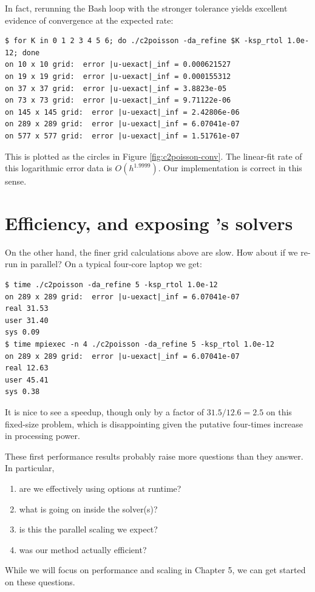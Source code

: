 In fact, rerunning the Bash loop with the stronger tolerance yields excellent evidence of convergence at the expected rate:
\begin{Verbatim}[fontsize=\small]
$ for K in 0 1 2 3 4 5 6; do ./c2poisson -da_refine $K -ksp_rtol 1.0e-12; done
on 10 x 10 grid:  error |u-uexact|_inf = 0.000621527
on 19 x 19 grid:  error |u-uexact|_inf = 0.000155312
on 37 x 37 grid:  error |u-uexact|_inf = 3.8823e-05
on 73 x 73 grid:  error |u-uexact|_inf = 9.71122e-06
on 145 x 145 grid:  error |u-uexact|_inf = 2.42806e-06
on 289 x 289 grid:  error |u-uexact|_inf = 6.07041e-07
on 577 x 577 grid:  error |u-uexact|_inf = 1.51761e-07
\end{Verbatim}
This is plotted as the circles in Figure \ref{fig:c2poisson-conv}.  The linear-fit rate of this logarithmic error data is $O(h^{1.9999})$.  Our implementation is correct in this sense.


\section{Efficiency, and exposing \PETSc's solvers}

On the other hand, the finer grid calculations above are slow.  How about if we re-run in parallel?  On a typical four-core laptop we get:
\begin{Verbatim}[fontsize=\small]
$ time ./c2poisson -da_refine 5 -ksp_rtol 1.0e-12
on 289 x 289 grid:  error |u-uexact|_inf = 6.07041e-07
real 31.53
user 31.40
sys 0.09
$ time mpiexec -n 4 ./c2poisson -da_refine 5 -ksp_rtol 1.0e-12
on 289 x 289 grid:  error |u-uexact|_inf = 6.07041e-07
real 12.63
user 45.41
sys 0.38
\end{Verbatim}
It is nice to see a speedup, though only by a factor of $31.5/12.6 = 2.5$ on this fixed-size problem, which is disappointing given the putative four-times increase in processing power.

These first performance results probably raise more questions than they answer.  In particular,
\renewcommand{\labelenumi}{\roman{enumi})}
\begin{enumerate}
\item are we effectively using \PETSc options at runtime?
\item what is going on inside the \PETSc solver(s)?
\item is this the parallel scaling we expect?
\item was our method actually efficient?
\end{enumerate}
While we will focus on performance and scaling in Chapter 5, we can get started on these questions.

